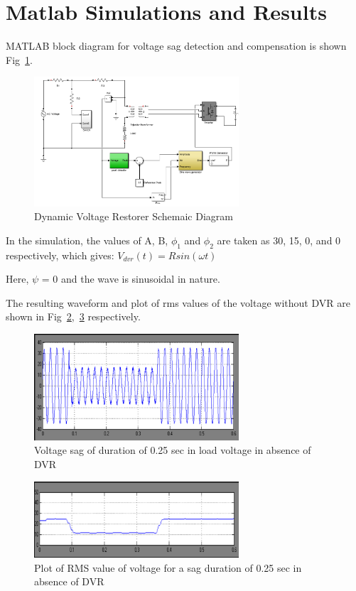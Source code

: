 \documentclass[journal,twoside]{IEEEtran}
\begin{document}
	\section{Matlab Simulations and Results}

MATLAB block diagram for voltage sag detection and
compensation is shown Fig~\ref{f4}.
\begin{figure}[!ht]
\centering
\includegraphics[width=3in]{4}
\caption{Dynamic Voltage Restorer Schemaic Diagram}
\label{f4}
\end{figure}


In the simulation, the values of A, B, $\phi _1$ and $\phi _2$ are
taken as 30, 15, 0, and 0 respectively, which gives:
$V_{dvr}(t)= Rsin(\omega t )$

Here, $\psi$ = 0 and the wave is sinusoidal in nature.

The resulting waveform and plot of rms values of the
voltage without DVR are shown in Fig~\ref{f5},~\ref{f6}
respectively.

\begin{figure}[!ht]
\centering
\includegraphics[width=3in]{5}
\caption{Voltage sag of duration of 0.25 sec in load voltage
in absence of DVR}
\label{f5}
\end{figure}


\begin{figure}[!ht]
\centering
\includegraphics[width=3in]{6}
\caption{Plot of RMS value of voltage for a sag duration of
0.25 sec in absence of DVR}
\label{f6}
\end{figure}
\end{document}

